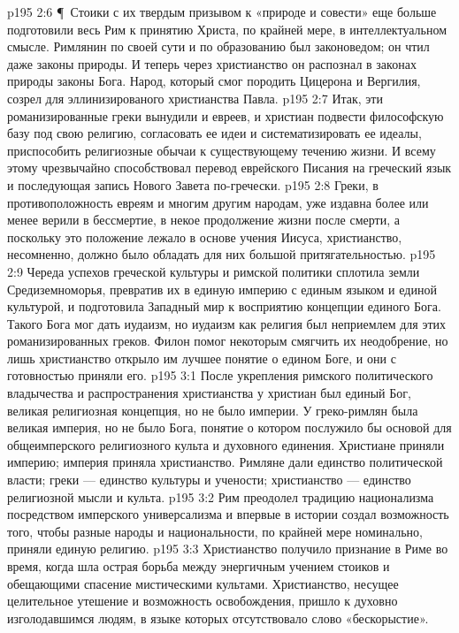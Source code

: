 \vs p195 2:6 \P\ Стоики с их твердым призывом к «природе и совести» еще больше подготовили весь Рим к принятию Христа, по крайней мере, в интеллектуальном смысле. Римлянин по своей сути и по образованию был законоведом; он чтил даже законы природы. И теперь через христианство он распознал в законах природы законы Бога. Народ, который смог породить Цицерона и Вергилия, созрел для эллинизированого христианства Павла.
\vs p195 2:7 Итак, эти романизированные греки вынудили и евреев, и христиан подвести философскую базу под свою религию, согласовать ее идеи и систематизировать ее идеалы, приспособить религиозные обычаи к существующему течению жизни. И всему этому чрезвычайно способствовал перевод еврейского Писания на греческий язык и последующая запись Нового Завета по\hyp{}гречески.
\vs p195 2:8 Греки, в противоположность евреям и многим другим народам, уже издавна более или менее верили в бессмертие, в некое продолжение жизни после смерти, а поскольку это положение лежало в основе учения Иисуса, христианство, несомненно, должно было обладать для них большой притягательностью.
\vs p195 2:9 Череда успехов греческой культуры и римской политики сплотила земли Средиземноморья, превратив их в единую империю с единым языком и единой культурой, и подготовила Западный мир к восприятию концепции единого Бога. Такого Бога мог дать иудаизм, но иудаизм как религия был неприемлем для этих романизированных греков. Филон помог некоторым смягчить их неодобрение, но лишь христианство открыло им лучшее понятие о едином Боге, и они с готовностью приняли его.
\vs p195 3:1 После укрепления римского политического владычества и распространения христианства у христиан был единый Бог, великая религиозная концепция, но не было империи. У греко\hyp{}римлян была великая империя, но не было Бога, понятие о котором послужило бы основой для общеимперского религиозного культа и духовного единения. Христиане приняли империю; империя приняла христианство. Римляне дали единство политической власти; греки --- единство культуры и учености; христианство --- единство религиозной мысли и культа.
\vs p195 3:2 Рим преодолел традицию национализма посредством имперского универсализма и впервые в истории создал возможность того, чтобы разные народы и национальности, по крайней мере номинально, приняли единую религию.
\vs p195 3:3 Христианство получило признание в Риме во время, когда шла острая борьба между энергичным учением стоиков и обещающими спасение мистическими культами. Христианство, несущее целительное утешение и возможность освобождения, пришло к духовно изголодавшимся людям, в языке которых отсутствовало слово «бескорыстие».

